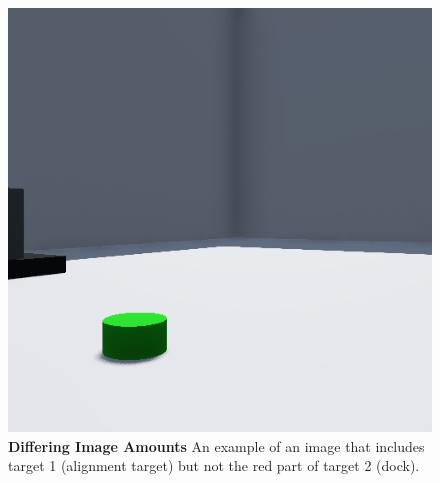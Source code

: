 \begin{figure}[H]
    \centering
    \includegraphics[width=0.95\columnwidth]{figures/src/target_1_but_not_target_2.png}
    \caption{
	    \textbf{Differing Image Amounts} An example of an image that includes target 1 (alignment target) but not the red part of target 2 (dock). 
    }
    \label{fig:target_1_but_not_target_2}
\end{figure}
